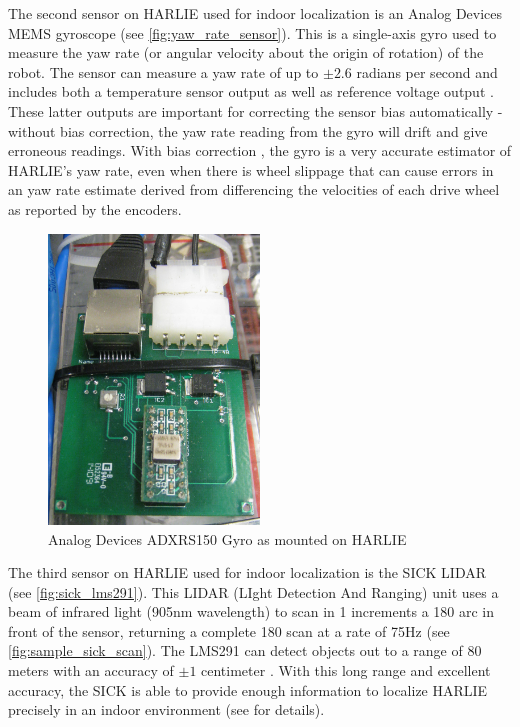 The second sensor on HARLIE used for indoor localization is an Analog Devices MEMS gyroscope (see \autoref{fig:yaw_rate_sensor}). This is a single-axis gyro used to measure the yaw rate (or angular velocity about the origin of rotation) of the robot. The sensor can measure a yaw rate of up to $\pm2.6$ radians per second and includes both a temperature sensor output as well as reference voltage output \autocite{ADXRS150Datasheet}. These latter outputs are important for correcting the sensor bias automatically - without bias correction, the yaw rate reading from the gyro will drift and give erroneous readings. With bias correction , the gyro is a very accurate estimator of HARLIE's yaw rate, even when there is wheel slippage that can cause errors in an yaw rate estimate derived from differencing the velocities of each drive wheel as reported by the encoders.

\begin{figure}
\centering
\includegraphics[width=0.5\textwidth]{images/yaw_rate_sensor}
\caption{Analog Devices ADXRS150 Gyro as mounted on HARLIE \label{fig:yaw_rate_sensor}}
\end{figure}

The third sensor on HARLIE used for indoor localization is the SICK LIDAR (see \autoref{fig:sick_lms291}). This LIDAR (LIght Detection And Ranging) unit uses a beam of infrared light (905nm wavelength) to scan in 1\degree{} increments a 180\degree{} arc in front of the sensor, returning a complete 180\degree{} scan at a rate of 75Hz (see \autoref{fig:sample_sick_scan}). The LMS291 can detect objects out to a range of 80 meters with an accuracy of $\pm1$ centimeter \autocite{SICKLMS291Datasheet}. With this long range and excellent accuracy, the SICK is able to provide enough information to localize HARLIE precisely in an indoor environment (see  for details). 

